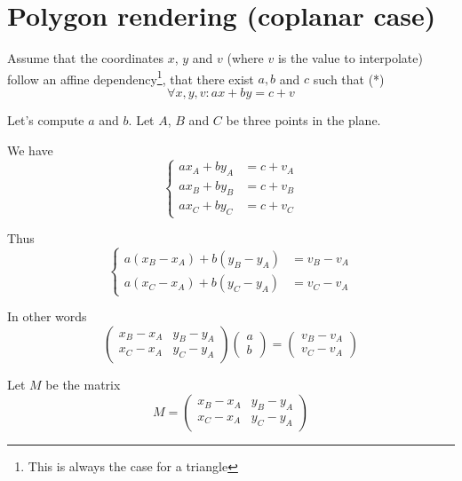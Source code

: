 \section{Polygon rendering (coplanar case)}
Assume that the coordinates $x$, $y$ and $v$ (where $v$ is the value
to interpolate) follow an affine dependency\footnote{This is always
  the case for a triangle}, \ie that there exist $a, b$
and $c$ such that (*)
$$\forall x, y, v: a x + b y = c + v$$


Let's compute $a$ and $b$. Let $A$, $B$ and $C$ be three points in the
plane.

We have 
\begin{displaymath}
  \left\{
  \begin{aligned}
    a x_A + b y_A & = c + v_A \\
    a x_B + b y_B & = c + v_B \\
    a x_C + b y_C & = c + v_C
  \end{aligned}\right.
\end{displaymath}

Thus
\begin{displaymath}
  \left\{
  \begin{aligned}
    a (x_B - x_A) + b (y_B - y_A) & = v_B - v_A \\
    a (x_C - x_A) + b (y_C - y_A) & = v_C - v_A
  \end{aligned}
\right.
\end{displaymath}

In other words
\begin{displaymath}
  \left(
    \begin{array}{cc}
      x_B - x_A & y_B - y_A \\
      x_C - x_A & y_C - y_A
    \end{array}
  \right)
  \left(
    \begin{array}{c}
      a \\
      b 
    \end{array}
  \right)
  =
  \left(
    \begin{array}{c}
      v_B - v_A \\
      v_C - v_A
    \end{array}
  \right)
\end{displaymath}

Let $M$ be the matrix
\begin{displaymath}
  M = 
  \left(
    \begin{array}{cc}
      x_B - x_A & y_B - y_A \\
      x_C - x_A & y_C - y_A
    \end{array}
  \right)
\end{displaymath}


